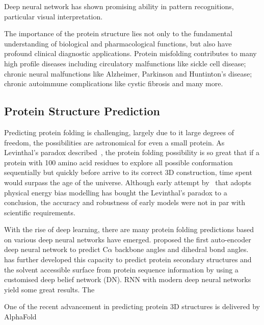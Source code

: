 Deep neural network has shown promising ability in pattern recognitions, particular visual interpretation.
\par 
The importance of the protein structure lies not only to the fundamental understanding of biological and pharmacological functions, but also have profound clinical diagnostic applications. Protein misfolding contributes to many high profile diseases including circulatory malfunctions like sickle cell disease; chronic neural malfunctions like Alzheimer, Parkinson and Huntinton's disease; chronic autoimmune complications like cystic fibrosis and many more.~\cite{Hammarstrom_2003,Chiti_2006,Selkoe_2003}  
\par 

\subsection{Protein Structure Prediction}
Predicting protein folding is challenging, largely due to it large degrees of freedom, the possibilities are astronomical for even a small protein. As Levinthal's paradox described~\cite{LEV69}, the protein folding possibility is so great that if a protein with 100 amino acid residues to explore all possible conformation sequentially but quickly before arrive to its correct 3D construction, time spent would surpass the age of the universe. Although early attempt by~\citet{Zwanzig_1992} that adopts physical energy bias modelling has bought the Levinthal's paradox to a conclusion, the accuracy and robustness of early models were not in par with scientific requirements.  
\par 
With the rise of deep learning, there are many protein folding predictions based on various deep neural networks have emerged. \citet{Lyons_2014} proposed the first auto-encoder deep neural network to predict C$\alpha$ backbone angles and dihedral bond angles.~\citet{Heffernan_2015} has further developed this capacity to predict protein secondary structures and the solvent accessible surface from protein sequence information by using a customised deep belief network (DN). RNN with modern deep neural networks yield some great results. The 

One of the recent advancement in predicting protein 3D structures is delivered by AlphaFold